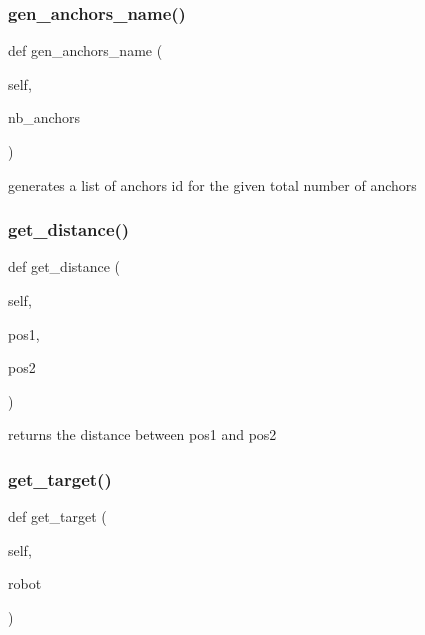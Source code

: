 \subsubsection{\texorpdfstring{gen\+\_\+anchors\+\_\+name()}{gen\_anchors\_name()}}
{\footnotesize\ttfamily def gen\+\_\+anchors\+\_\+name (\begin{DoxyParamCaption}\item[{}]{self,  }\item[{}]{nb\+\_\+anchors }\end{DoxyParamCaption})}

\begin{DoxyVerb}generates a list of anchors id for the given total number of anchors\end{DoxyVerb}
 \mbox{\label{classworld_1_1_world_a04f4980a53d4b6e76ba5d02deb413780}} 
\subsubsection{\texorpdfstring{get\+\_\+distance()}{get\_distance()}}
{\footnotesize\ttfamily def get\+\_\+distance (\begin{DoxyParamCaption}\item[{}]{self,  }\item[{}]{pos1,  }\item[{}]{pos2 }\end{DoxyParamCaption})}

\begin{DoxyVerb}returns the distance between pos1 and pos2\end{DoxyVerb}
 \mbox{\label{classworld_1_1_world_afdf01fd0b61dfe848a1606619c1b2902}} 
\subsubsection{\texorpdfstring{get\+\_\+target()}{get\_target()}}
{\footnotesize\ttfamily def get\+\_\+target (\begin{DoxyParamCaption}\item[{}]{self,  }\item[{}]{robot }\end{DoxyParamCaption})}

